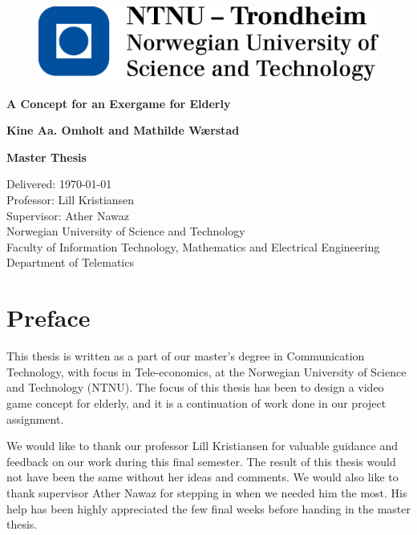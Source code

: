 \documentclass[b5paper,twoside,openright,11pt]{report}
\begin{document}
\begin{flushleft}
\begin{figure}[htb]
\includegraphics[scale=0.6]{NTNU-logo}
\end{figure}
\bigskip
\bigskip
\bigskip
\bigskip
\begin{huge}
\textbf{A Concept for an Exergame for Elderly}\\
\end{huge} 
\bigskip
\bigskip
\bigskip
\bigskip
\bigskip
\bigskip
\bigskip
\begin{Large}
\textbf{Kine Aa. Omholt and Mathilde Wærstad \\}
\end{Large}
\bigskip
\bigskip
\bigskip
\bigskip
\bigskip
\bigskip
\begin{large}
\textbf{Master Thesis\\}
\end{large}
Delivered: \today\\
Professor: Lill Kristiansen\\
Supervisor: Ather Nawaz\\
\bigskip
\bigskip
\bigskip
\bigskip
\bigskip
Norwegian University of Science and Technology\\ 
Faculty of Information Technology, Mathematics and Electrical Engineering\\
Department of Telematics
\end{flushleft}
\cleardoublepage
\begin{abstract}

\end{abstract}
\cleardoublepage
\chapter*{Preface}
This thesis is written as a part of our master's degree in Communication Technology, with focus in Tele-economics, at the Norwegian University of Science and Technology (NTNU). The focus of this thesis has been to design a video game concept for elderly, and it is a continuation of work done in our project assignment. 

We would like to thank our professor Lill Kristiansen for valuable guidance and feedback on our work during this final semester. The result of this thesis would not have been the same without her ideas and comments. We would also like to thank supervisor Ather Nawaz for stepping in when we needed him the most. His help has been highly appreciated the few final weeks before handing in the master thesis.  
\end{document}
